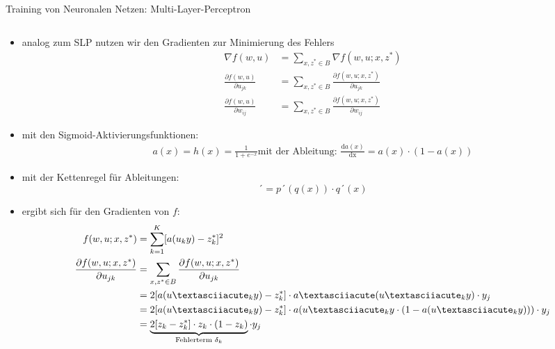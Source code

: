 \documentclass[aspectratio=1610, xcolor=dvipsnames, 9pt]{beamer}
\begin{document}
      \begin{frame}{Training von Neuronalen Netzen: Multi-Layer-Perceptron}
        \begin{columns}
          \begin{column}{1\textwidth}
            \begin{itemize}
              \item analog zum SLP nutzen wir den Gradienten zur Minimierung des Fehlers
            \begin{align*}
              \nabla f(w,u) &= \sum_{x,z^* \in B} \nabla f(w, u; x,z^*) \\
              \frac{\partial f(w,u)}{\partial u_{jk}} &= \sum_{x,z^* \in B} \frac{\partial f(w,u;x,z^*)}{\partial u_{jk}} \\
              \frac{\partial f(w,u)}{\partial w_{ij}} &= \sum_{x,z^* \in B} \frac{\partial f(w,u;x,z^*)}{\partial w_{ij}} 
            \end{align*}
            \item mit den Sigmoid-Aktivierungsfunktionen:
            \begin{align*}
              a(x) = h(x) = \frac{1}{1+e^{-x}} \text{mit der Ableitung:  } \frac{\text{d}a(x)}{\text{dx}} = a(x) \cdot (1 - a(x))
            \end{align*}
            \item mit der Kettenregel für Ableitungen:
            \begin{equation*}
              [p(q(x))]´ = p´(q(x)) \cdot q´(x) 
            \end{equation*}
            \item ergibt sich für den Gradienten von $f$:
            \begin{align*}
              f(w,u;x,z^*) &= \sum_{k=1} ^K [a(u_k y) - z^*_k]^2 \\
              \frac{\partial f(w,u; x,z^*) }{ \partial u_{jk} } &= \sum_{x,z^* \in B} \frac{\partial f(w,u;x,z^*)}{\partial u_{jk}} \\
                                                            &= 2 [a(u´_k y)-z^*_k] \cdot a´(u´_k y) \cdot y_j \\
                                                            &= 2 [a(u´_k y)-z^*_k] \cdot a(u´_k y \cdot (1 - a(u´_k y)))\cdot y_j\\
                                                            &=  \underbrace{ 2 [z_k - z^*_k] \cdot z_k \cdot (1- z_k) }_\text{Fehlerterm $ \delta_k$} \cdot y_j \\

\end{align*}
\end{itemize}
\end{column}
\end{columns}
\end{frame}
\end{document}
